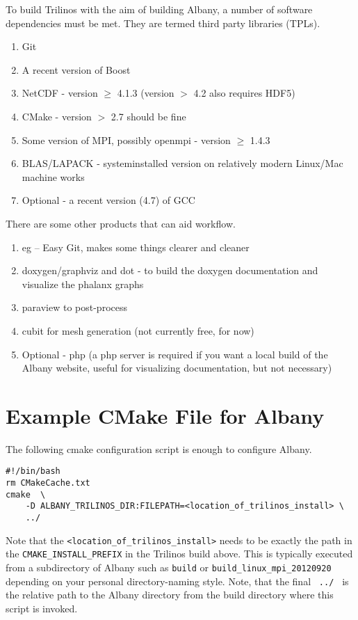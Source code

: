 \documentclass[pdf,12pt,report,strict]{SANDreport}
\theoremstyle{remark}
\begin{document}
To build Trilinos with the aim of building Albany, a number of
software dependencies must be met. They are termed third party
libraries (TPLs). 
\begin{enumerate}
\item Git
\item A recent version of Boost
\item NetCDF - version $\ge$ 4.1.3 (version $>$ 4.2 also requires
  HDF5)
\item CMake - version $>$ 2.7 should be fine
\item Some version of MPI, possibly openmpi - version $\ge$ 1.4.3
\item BLAS/LAPACK - systeminstalled version on relatively modern
  Linux/Mac machine works
\item Optional - a recent version (4.7) of GCC
\end{enumerate}
There are some other products that can aid workflow.
\begin{enumerate}
\item eg -- Easy Git, makes some things clearer and cleaner
\item doxygen/graphviz and dot - to build the doxygen documentation
  and visualize the phalanx graphs
\item paraview to post-process
\item cubit for mesh generation (not currently free, for now)
\item Optional - php (a php server is required if you want a local
  build of the Albany website, useful for visualizing documentation,
  but not necessary)
\end{enumerate}

\section{Example CMake File for Albany}
The following cmake configuration script is enough to configure Albany.
\begin{verbatim}
#!/bin/bash
rm CMakeCache.txt
cmake  \
    -D ALBANY_TRILINOS_DIR:FILEPATH=<location_of_trilinos_install> \
    ../
\end{verbatim}
Note that the \texttt{<location\_of\_trilinos\_install>} needs to be
exactly the path in the \texttt{CMAKE\_INSTALL\_PREFIX} in the Trilinos
build above.  This is typically executed from a subdirectory of Albany such as
\texttt{build} or \texttt{build\_linux\_mpi\_20120920} depending on
your personal directory-naming style.
Note, that the final \texttt{   ../  } is the relative path to the Albany
directory from the build directory where this script is invoked.
\end{document}
